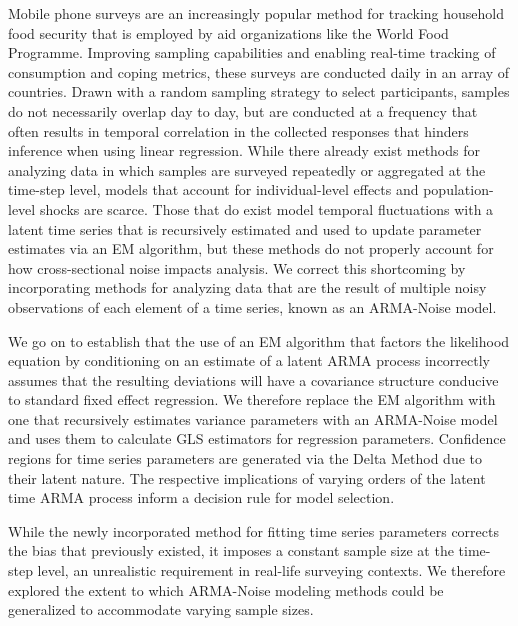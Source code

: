 \pagestyle{headings}

Mobile phone surveys are an increasingly popular method for tracking household food security that is employed by aid organizations like the World Food Programme. Improving sampling capabilities and enabling real-time tracking of consumption and coping metrics, these surveys are conducted daily in an array of countries. Drawn with a random sampling strategy to select participants, samples do not necessarily overlap day to day, but are conducted at a frequency that often results in temporal correlation in the collected responses that hinders inference when using linear regression. While there already exist methods for analyzing data in which samples are surveyed repeatedly or aggregated at the time-step level, models that account for individual-level effects and population-level shocks are scarce. Those that do exist model temporal fluctuations with a latent time series that is recursively estimated and used to update parameter estimates via an EM algorithm, but these methods do not properly account for how cross-sectional noise impacts analysis. We correct this shortcoming by incorporating methods for analyzing data that are the result of multiple noisy observations of each element of a time series, known as an ARMA-Noise model. 

We go on to establish that the use of an EM algorithm that factors the likelihood equation by conditioning on an estimate of a latent ARMA process incorrectly assumes that the resulting deviations will have a covariance structure conducive to standard fixed effect regression. We therefore replace the EM algorithm with one that recursively estimates variance parameters with an ARMA-Noise model and uses them to calculate GLS estimators for regression parameters. Confidence regions for time series parameters are generated via the Delta Method due to their latent nature. The respective implications of varying orders of the latent time ARMA process inform a decision rule for model selection.

While the newly incorporated method for fitting time series parameters corrects the bias that previously existed, it imposes a constant sample size at the time-step level, an unrealistic requirement in real-life surveying contexts. We therefore explored the extent to which ARMA-Noise modeling methods could be generalized to accommodate varying sample sizes. 

